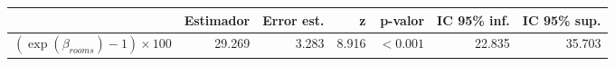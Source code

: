 
\begin{tabular}{lrrrrrr}
\toprule
  & Estimador & Error est. & z & p-valor & IC 95\% inf. & IC 95\% sup.\\
\midrule
$(\exp(\beta_{rooms})-1)\times 100$ & 29.269 & 3.283 & 8.916 & $<0.001$ & 22.835 & 35.703\\
\bottomrule
\end{tabular}
